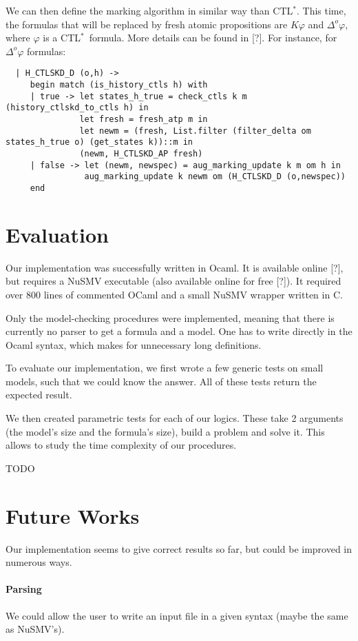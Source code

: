 \documentclass[dvipsnames]{acmart}
\def\ctls{CTL$^{*}$}
\def\K{\mathit{K}}
\def\D#1{\Delta^{#1}}
\begin{document}
We can then define the marking algorithm in similar way than \ctls. This time, the formulas that will be replaced by fresh atomic propositions are $\K\varphi$ and $\D{o}\varphi$, where $\varphi$ is a \ctls\ formula. More details can be found in [?].
For instance, for $\D{o}\varphi$ formulas:
\begin{lstlisting}
  | H_CTLSKD_D (o,h) ->
     begin match (is_history_ctls h) with
     | true -> let states_h_true = check_ctls k m (history_ctlskd_to_ctls h) in
               let fresh = fresh_atp m in
               let newm = (fresh, List.filter (filter_delta om states_h_true o) (get_states k))::m in
               (newm, H_CTLSKD_AP fresh)
     | false -> let (newm, newspec) = aug_marking_update k m om h in
                aug_marking_update k newm om (H_CTLSKD_D (o,newspec))
     end
\end{lstlisting}


\section{Evaluation}
Our implementation was successfully written in Ocaml. It is available online [?], but requires a NuSMV executable (also available online for free [?]). It required over 800 lines of commented OCaml and a small NuSMV wrapper written in C.

Only the model-checking procedures were implemented, meaning that there is currently no parser to get a formula and a model. One has to write directly in the Ocaml syntax, which makes for unnecessary long definitions.

To evaluate our implementation, we first wrote a few generic tests on small models, such that we could know the answer.
All of these tests return the expected result.

We then created parametric tests for each of our logics. These take 2 arguments (the model's size and the formula's size), build a problem and solve it. This allows to study the time complexity of our procedures.

TODO

\section{Future Works}
Our implementation seems to give correct results so far, but could be improved in numerous ways.

\paragraph{Parsing}
We could allow the user to write an input file in a given syntax (maybe the same as NuSMV's).
\end{document}
